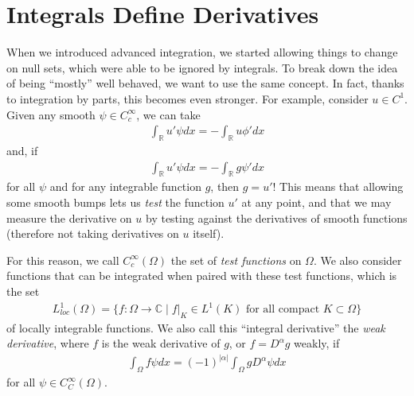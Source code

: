 \documentclass{article}
\newcommand{\R}{{\mathbb{R}}}
\newcommand{\C}{{\mathbb{C}}}
\begin{document}
	\section{Integrals Define Derivatives}
	
	When we introduced advanced integration, we started allowing things to change on null sets, which were able to be ignored by integrals. To break down the idea of being ``mostly'' well behaved, we want to use the same concept. In fact, thanks to integration by parts, this becomes even stronger. For example, consider $u \in C^{1}$. Given any smooth $\psi \in C_{c}^{\infty}$, we can take 
	\begin{align*}
		\int_{\R} u' \psi dx = -\int_{\R} u \phi' dx
	\end{align*}
	and, if 
	\begin{align*}
		\int_{\R} u' \psi dx = -\int_{\R} g \psi' dx
	\end{align*}
	for all $\psi$ and for any integrable function $g$, then $g = u'$! This means that allowing some smooth bumps lets us \textit{test} the function $u'$ at any point, and that we may measure the derivative on $u$ by testing against the derivatives of smooth functions (therefore not taking derivatives on $u$ itself). 
	
	For this reason, we call $C_{c}^{\infty}(\Omega)$ the set of \textit{test functions} on $\Omega$. We also consider functions that can be integrated when paired with these test functions, which is the set 
	\begin{align*}
		L^{1}_{loc}(\Omega) = \{ f: \Omega \to \C \mid f|_{K} \in L^{1}(K) \text{ for all compact } K \subset \Omega\}
	\end{align*}
	of locally integrable functions. We also call this ``integral derivative'' the \textit{weak derivative}, where $f$ is the weak derivative of $g$, or $f = D^{\alpha} g$ weakly, if
	\begin{align*}
		\int_{\Omega} f \psi dx = (-1)^{|\alpha|}\int_{\Omega} g D^{\alpha}\psi dx
	\end{align*}
	for all $\psi \in C_{C}^{\infty}(\Omega)$. 
	
\end{document}
